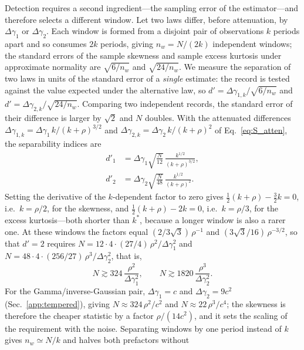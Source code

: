 \documentclass[preprint,12pt]{elsarticle}
\begin{document}
Detection requires a second ingredient---the sampling error of the
estimator---and therefore selects a different window. Let two laws differ,
before attenuation, by $\Delta\gamma_1$ or $\Delta\gamma_2$. Each window is
formed from a disjoint pair of observations $k$ periods apart and so consumes
$2k$ periods, giving $n_w=N/(2k)$ independent windows; the standard errors of
the sample skewness and sample excess kurtosis under approximate normality are
$\sqrt{6/n_w}$ and $\sqrt{24/n_w}$. We measure the separation of two
laws in units of the standard error of a \emph{single} estimate: the record is
tested against the value expected under the alternative law, so
$d'=\Delta\gamma_{1,k}/\sqrt{6/n_w}$ and
$d'=\Delta\gamma_{2,k}/\sqrt{24/n_w}$. Comparing two independent records,
the standard error of their difference is larger by $\sqrt2$ and $N$ doubles.
With the attenuated differences
$\Delta\gamma_{1,k}=\Delta\gamma_1\,k/(k+\rho)^{3/2}$ and
$\Delta\gamma_{2,k}=\Delta\gamma_2\,k/(k+\rho)^{2}$ of
Eq.~\eqref{eq:S_atten}, the separability indices are
\begin{equation}
\begin{aligned}
  d'_1&=\Delta\gamma_1\sqrt{\frac{N}{12}}\,\frac{k^{1/2}}{(k+\rho)^{3/2}},\\
  d'_2&=\Delta\gamma_2\sqrt{\frac{N}{48}}\,\frac{k^{1/2}}{(k+\rho)^{2}}.
\end{aligned}
  \label{eq:dprime}
\end{equation}
Setting the derivative of the $k$-dependent factor to zero gives
$\tfrac12(k+\rho)-\tfrac32k=0$, i.e.\ $k=\rho/2$, for the skewness, and
$\tfrac12(k+\rho)-2k=0$, i.e.\ $k=\rho/3$, for the excess kurtosis---both
shorter than $k^\ast$, because a longer window is also a rarer one. At these
windows the factors equal $(2/3\sqrt3)\,\rho^{-1}$ and
$(3\sqrt3/16)\,\rho^{-3/2}$, so that $d'=2$ requires
$N=12\cdot4\cdot(27/4)\,\rho^2/\Delta\gamma_1^2$ and
$N=48\cdot4\cdot(256/27)\,\rho^3/\Delta\gamma_2^2$, that is,
\begin{equation}
  N\gtrsim 324\,\frac{\rho^{2}}{\Delta\gamma_1^{2}},
  \qquad
  N\gtrsim 1820\,\frac{\rho^{3}}{\Delta\gamma_2^{2}}.
  \label{eq:Nreq_general}
\end{equation}
For the Gamma/inverse-Gaussian pair, $\Delta\gamma_1=c$ and
$\Delta\gamma_2=9c^2$ (Sec.~\ref{app:tempered}), giving
$N\approx324\,\rho^2/c^2$ and $N\approx22\,\rho^3/c^4$; the skewness is
therefore the cheaper statistic by a factor $\rho/(14c^{2})$, and it sets the
scaling of the requirement with the noise. Separating windows by one period
instead of $k$ gives $n_w\simeq N/k$ and halves both prefactors without
\end{document}
